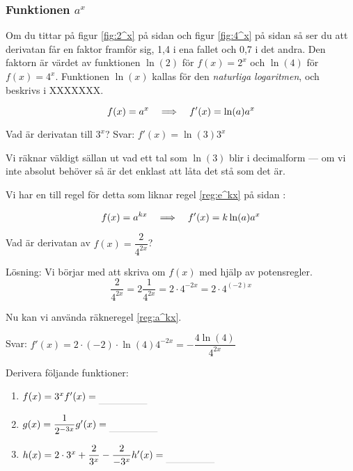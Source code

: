 \documentclass[a4paper, 12pt]{article}
\begin{document}
\subsubsection{Funktionen $a^x$}
Om du tittar på figur \ref*{fig:2^x} på sidan \pageref*{fig:2^x} och figur \ref*{fig:4^x} på sidan \pageref*{fig:4^x} så ser du att derivatan får en faktor framför sig, 1,4 i ena fallet och 0,7 i det andra. Den faktorn är värdet av funktionen $\ln(2)$ för $f(x) = 2^x$ och $\ln(4)$ för $f(x) = 4^x$. Funktionen $\ln (x)$ kallas för den \emph{naturliga logaritmen}, och beskrivs i XXXXXXX.


\begin{regel}
    \label{reg:a^x}
    \[f(x) = a^x \hspace{1em} \Longrightarrow \hspace{1em} f'(x) = \ln (a) a^x \]
\end{regel}


\begin{exempel}
    \label{ex:a^x}
    Vad är derivatan till $3^x$?
    Svar: $f'(x) = \ln (3) 3^x$
\end{exempel}

Vi räknar väldigt sällan ut vad ett tal som $\ln(3)$ blir i decimalform --- om vi inte absolut behöver så är det enklast att låta det stå som det är.

Vi har en till regel för detta som liknar regel \ref*{reg:e^kx} på sidan \pageref*{reg:e^kx}:

\begin{regel}
    \label{reg:a^kx}
    \[f(x) = a^{kx} \hspace{1em} \Longrightarrow \hspace{1em} f'(x) = k\ln(a)a^x\]
\end{regel}


\begin{exempel}
    Vad är derivatan av $f(x) = \dfrac 2{4^{2x}}$?
    
    Lösning: Vi börjar med att skriva om $f(x)$ med hjälp av potensregler.
    \[\dfrac{2}{4^{2x}} = 2\dfrac{1}{4^{2x}} = 2\cdot 4^{-2x} = 2\cdot 4^{(-2)x}\]

    Nu kan vi använda räkneregel \ref*{reg:a^kx}.

    Svar: $f'(x) = 2\cdot (-2) \cdot \ln(4) 4^{-2x} = - \dfrac {4\ln(4)} {4^{2x}}$
\end{exempel}

\begin{uppgifter}
    Derivera följande funktioner:
    \begin{multicols}{3}
        \begin{enumerate}
            \item $f(x) = 3^x \\ f'(x) \ans$
            \item $g(x) = \dfrac{1}{2^{-3x}} \\ g'(x) \ans$
            \item $h(x) = 2\cdot 3^x + \dfrac 2{3^x} - \dfrac 2{-3^x} \\ h'(x) \ans$
        \end{enumerate}
    \end{multicols}
\end{uppgifter}
\end{document}
